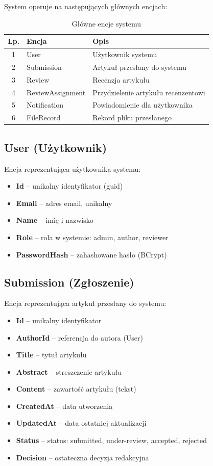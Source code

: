 \documentclass[times]{san}
\begin{document}
System operuje na następujących głównych encjach:

\begin{table}[h]
\centering
\caption{Główne encje systemu}
\label{tab:entities}
\begin{tabular}{|c|l|p{5cm}|}
\hline
Lp. & Encja & Opis \\
\hline
1   & User & Użytkownik systemu \\
2   & Submission & Artykuł przesłany do systemu \\
3   & Review & Recenzja artykułu \\
4   & ReviewAssignment & Przydzielenie artykułu recenzentowi \\
5   & Notification & Powiadomienie dla użytkownika \\
6   & FileRecord & Rekord pliku przesłanego \\
\hline
\end{tabular}
\end{table}

\subsection{User (Użytkownik)}

Encja reprezentująca użytkownika systemu:

\begin{itemize}
    \item \textbf{Id} -- unikalny identyfikator (guid)
    \item \textbf{Email} -- adres email, unikalny
    \item \textbf{Name} -- imię i nazwisko
    \item \textbf{Role} -- rola w systemie: admin, author, reviewer
    \item \textbf{PasswordHash} -- zahashowane hasło (BCrypt)
\end{itemize}

\subsection{Submission (Zgłoszenie)}

Encja reprezentująca artykuł przesłany do systemu:

\begin{itemize}
    \item \textbf{Id} -- unikalny identyfikator
    \item \textbf{AuthorId} -- referencja do autora (User)
    \item \textbf{Title} -- tytuł artykułu
    \item \textbf{Abstract} -- streszczenie artykułu
    \item \textbf{Content} -- zawartość artykułu (tekst)
    \item \textbf{CreatedAt} -- data utworzenia
    \item \textbf{UpdatedAt} -- data ostatniej aktualizacji
    \item \textbf{Status} -- status: submitted, under-review, accepted, rejected
    \item \textbf{Decision} -- ostateczna decyzja redakcyjna
\end{itemize}
\end{document}
